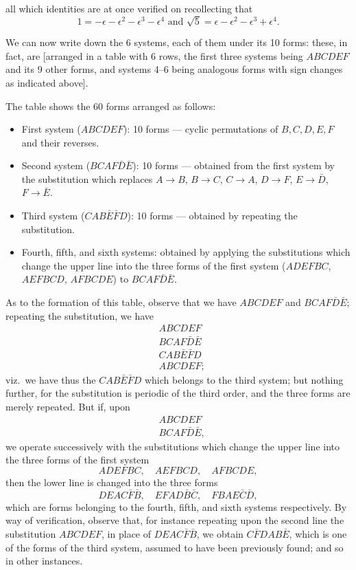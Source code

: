 \documentclass[12pt,a4paper]{article}
\theoremstyle{definition}
\begin{document}
all which identities are at once verified on recollecting that
\[
1 = -\epsilon - \epsilon^2 - \epsilon^3 - \epsilon^4 \text{ and } \sqrt{5} = \epsilon - \epsilon^2 - \epsilon^3 + \epsilon^4.
\]

We can now write down the 6 systems, each of them under its 10 forms:
these, in fact, are [arranged in a table with 6 rows, the first three systems
being $ABCDEF$ and its 9 other forms, and systems 4--6 being analogous
forms with sign changes as indicated above].

The table shows the 60 forms arranged as follows:
\begin{itemize}
\item First system ($ABCDEF$): 10 forms --- cyclic permutations of $B,C,D,E,F$
and their reverses.
\item Second system ($BCAF\bar{D}\bar{E}$): 10 forms --- obtained from the first system
by the substitution which replaces $A \to B$, $B \to C$, $C \to A$, $D \to F$, $E \to \bar{D}$, $F \to \bar{E}$.
\item Third system ($CAB\bar{E}\bar{F}D$): 10 forms --- obtained by repeating
the substitution.
\item Fourth, fifth, and sixth systems: obtained by applying the substitutions
which change the upper line into the three forms of the first system
($ADEFBC$, $AEFBCD$, $AFBCDE$) to $BCAF\bar{D}\bar{E}$.
\end{itemize}

As to the formation of this table, observe that we have $ABCDEF$ and $BCAF\bar{D}\bar{E}$;
repeating the substitution, we have
\begin{align*}
&ABCDEF\\
&BCAF\bar{D}\bar{E}\\
&CAB\bar{E}\bar{F}D\\
&ABCDEF;
\end{align*}
viz.\ we have thus the $CAB\bar{E}\bar{F}D$ which belongs to the third system; but nothing
further, for the substitution is periodic of the third order, and the three forms are
merely repeated. But if, upon
\begin{align*}
&ABCDEF\\
&BCAF\bar{D}\bar{E},
\end{align*}
we operate successively with the substitutions which change the upper line into the
three forms of the first system
\[
ADEFBC, \quad AEFBCD, \quad AFBCDE,
\]
then the lower line is changed into the three forms
\[
DEAC\bar{F}\bar{B}, \quad EFAD\bar{B}\bar{C}, \quad FBAE\bar{C}\bar{D},
\]
which are forms belonging to the fourth, fifth, and sixth systems respectively.
By way of verification, observe that, for instance repeating upon the second line the
substitution $ABCDEF$, in place of $DEAC\bar{F}\bar{B}$, we obtain $C\bar{F}DAB\bar{E}$, which is one
of the forms of the third system, assumed to have been previously found; and so in
other instances.
\end{document}

